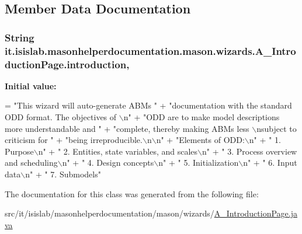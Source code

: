 \subsection{Member Data Documentation}
\hypertarget{classit_1_1isislab_1_1masonhelperdocumentation_1_1mason_1_1wizards_1_1_a___introduction_page_a48f9e6bddf3bb2d7ba3995b09dd4da0b}{
\subsubsection[{introduction}]{\setlength{\rightskip}{0pt plus 5cm}String it.\-isislab.\-masonhelperdocumentation.\-mason.\-wizards.\-A\-\_\-\-Introduction\-Page.\-introduction\hspace{0.3cm}{\ttfamily [static]}, {\ttfamily [private]}}}\label{classit_1_1isislab_1_1masonhelperdocumentation_1_1mason_1_1wizards_1_1_a___introduction_page_a48f9e6bddf3bb2d7ba3995b09dd4da0b}
{\bfseries Initial value\-:}
\begin{DoxyCode}
= \textcolor{stringliteral}{"This wizard will auto-generate ABMs "}
                            + \textcolor{stringliteral}{"documentation with the standard ODD format. The objectives of \(\backslash\)n"}
                            + \textcolor{stringliteral}{"ODD are to make model descriptions more understandable and "}
                            + \textcolor{stringliteral}{"complete, thereby making ABMs less \(\backslash\)nsubject to criticism for "}
                            + \textcolor{stringliteral}{"being irreproducible.\(\backslash\)n\(\backslash\)n"}
                            + \textcolor{stringliteral}{"Elements of ODD:\(\backslash\)n"}
                            + \textcolor{stringliteral}{"   1. Purpose\(\backslash\)n"}
                            + \textcolor{stringliteral}{"   2. Entities, state variables, and scales\(\backslash\)n"}
                            + \textcolor{stringliteral}{"   3. Process overview and scheduling\(\backslash\)n"}
                            + \textcolor{stringliteral}{"   4. Design concepts\(\backslash\)n"}
                            + \textcolor{stringliteral}{"   5. Initialization\(\backslash\)n"}  
                            + \textcolor{stringliteral}{"   6. Input data\(\backslash\)n"}
                            + \textcolor{stringliteral}{"   7. Submodels"}
\end{DoxyCode}


The documentation for this class was generated from the following file\-:\begin{DoxyCompactItemize}
\item 
src/it/isislab/masonhelperdocumentation/mason/wizards/\hyperlink{_a___introduction_page_8java}{A\-\_\-\-Introduction\-Page.\-java}\end{DoxyCompactItemize}

